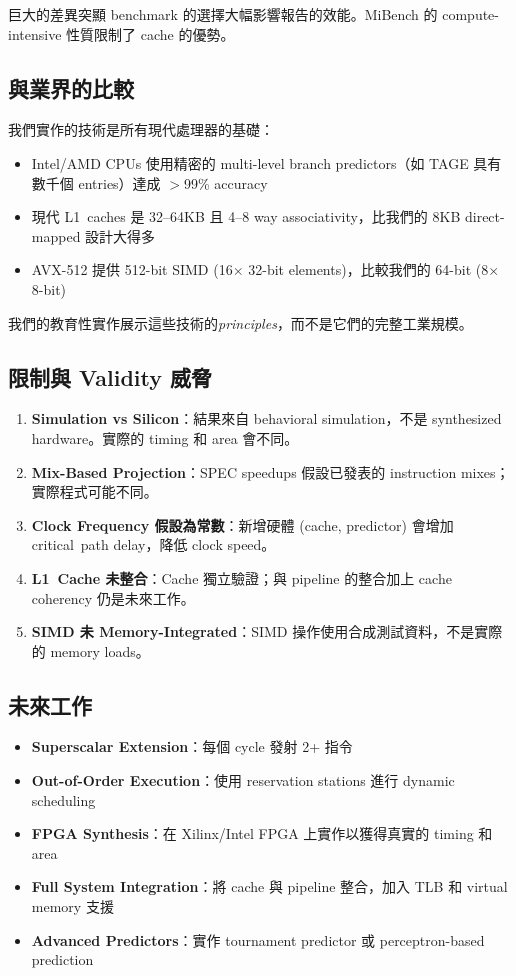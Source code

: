 \documentclass[journal]{IEEEtran}
\begin{document}
巨大的差異突顯 benchmark 的選擇大幅影響報告的效能。MiBench 的 compute-intensive 性質限制了 cache 的優勢。

\subsection{與業界的比較}
我們實作的技術是所有現代處理器的基礎：
\begin{itemize}
    \item Intel/AMD CPUs 使用精密的 multi-level branch predictors（如 TAGE 具有數千個 entries）達成 $>$99\% accuracy
    \item 現代 L1~caches 是 32--64KB 且 4--8 way associativity，比我們的 8KB direct-mapped 設計大得多
    \item AVX-512 提供 512-bit SIMD (16$\times$ 32-bit elements)，比較我們的 64-bit (8$\times$ 8-bit)
\end{itemize}

我們的教育性實作展示這些技術的\textit{principles}，而不是它們的完整工業規模。

\subsection{限制與 Validity 威脅}
\begin{enumerate}
\item \textbf{Simulation vs Silicon}：結果來自 behavioral simulation，不是 synthesized hardware。實際的 timing 和 area 會不同。
\item \textbf{Mix-Based Projection}：SPEC speedups 假設已發表的 instruction mixes；實際程式可能不同。
\item \textbf{Clock Frequency 假設為常數}：新增硬體 (cache, predictor) 會增加 critical~path delay，降低 clock speed。
\item \textbf{L1~Cache 未整合}：Cache 獨立驗證；與 pipeline 的整合加上 cache coherency 仍是未來工作。
\item \textbf{SIMD 未 Memory-Integrated}：SIMD 操作使用合成測試資料，不是實際的 memory loads。
\end{enumerate}

\subsection{未來工作}
\begin{itemize}
    \item \textbf{Superscalar Extension}：每個 cycle 發射 2+ 指令
    \item \textbf{Out-of-Order Execution}：使用 reservation stations 進行 dynamic scheduling
    \item \textbf{FPGA Synthesis}：在 Xilinx/Intel FPGA 上實作以獲得真實的 timing 和 area
    \item \textbf{Full System Integration}：將 cache 與 pipeline 整合，加入 TLB 和 virtual memory 支援
    \item \textbf{Advanced Predictors}：實作 tournament predictor 或 perceptron-based prediction
\end{itemize}
\end{document}
